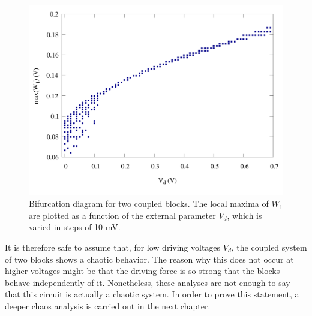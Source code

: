 \begin{figure}[H]
    \centering
    \includegraphics[width=0.6\linewidth]{../2_blocks/bifurcation/bifurcation.pdf}
    \caption{Bifurcation diagram for two coupled blocks.
    The local maxima of $W_1$ are plotted as a function of the external parameter $V_d$,
    which is varied in steps of 10 mV.}
    \label{fig: bifurcation}
\end{figure}

It is therefore safe to assume that, for low driving voltages $V_d$, the coupled system of two blocks shows a chaotic behavior.
The reason why this does not occur at higher voltages might be that the driving force is so strong that the blocks
behave independently of it. Nonetheless, these analyses are not enough to say that this circuit is actually a chaotic system.
In order to prove this statement, a deeper chaos analysis is carried out in the next chapter.





